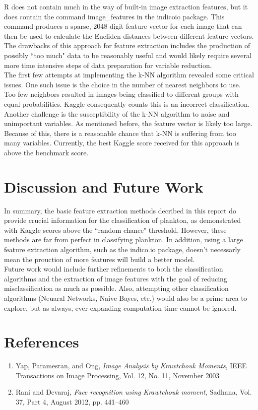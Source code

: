 \documentclass[12pt]{article}
\begin{document}
\noindent R does not contain much in the way of built-in image extraction features, but it does contain the command \textsf{image\_{features}} in the \textsf{indicoio} package.  This command produces a sparse, 2048 digit feature vector for each image that can then be used to calculate the Eucliden distances between different feature vectors. The drawbacks of this approach for feature extraction includes the production of possibly ``too much" data to be reasonably useful and would likely require several more time intensive steps of data preparation for variable reduction. \\

\noindent The first few attempts at implementing the k-NN algorithm revealed some critical issues. One such issue is the choice in the number of nearest neighbors to use. Too few neighbors resulted in images being classified to different groups with equal probabilities. Kaggle consequently counts this is an incorrect classification.  Another challenge is the susceptibility of the k-NN algorithm to noise and unimportant variables.  As mentioned before, the feature vector is likely too large. Because of this, there is a reasonable chance that k-NN is suffering from too many variables. Currently, the best Kaggle score received for this approach is above the benchmark score.  

\newpage
\section{Discussion and Future Work}
In summary, the basic feature extraction methods decribed in this report do provide crucial information for the classification of plankton, as demonstrated with Kaggle scores above the ``random chance" threshold. However, these methods are far from perfect in classifying plankton. In addition, using a large feature extraction algorithm, such as the \textsf{indico.io} package, doesn't necessarly mean the prouction of more features will build a better model. \\

\noindent Future work would include further refinements to both the classification algorithms and the extraction of image features with the goal of reducing misclassification as much as possible. Also, attempting other classification algorithms (Neuaral Networks, Naive Bayes, etc.) would also be a prime area to explore, but as always, ever expanding computation time cannot be ignored.

\section{References}
	\begin{enumerate}
		\item Yap, Paramesran, and Ong, \textit{Image Analysis by Krawtchouk Moments}, IEEE Transactions on Image Processing, Vol. 12, No. 11, November 2003
		\item Rani and Devaraj, \textit{Face recognition using Krawtchouk moment}, Sadhana, Vol. 37, Part 4, August 2012, pp. 441–460
	\end{enumerate}
\end{document}
